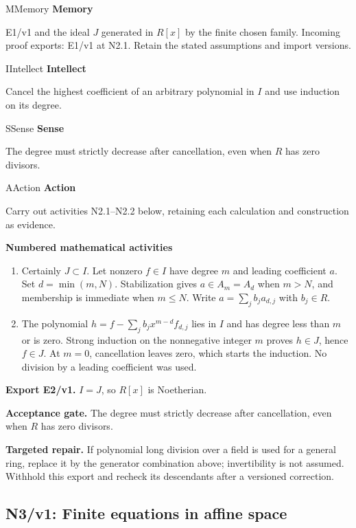 \documentclass[preprint,12pt,aps,pra,showkeys,amsmath,amssymb,superscriptaddress,floatfix]{revtex4-2}
\theoremstyle{definition}
\theoremstyle{remark}
\newcommand{\mmfaculty}[3]{%
 \begin{mmfacultybox}{#1}{#2}
 {\sffamily\bfseries\color{MMBlue}#2}\par\smallskip #3
 \end{mmfacultybox}}
\newcommand{\field}[2]{\par\smallskip\noindent\textbf{#1.} #2\par}
\begin{document}
\mmfaculty{M}{Memory}{E1/v1 and the ideal \(J\) generated in \(R[x]\) by the finite chosen
family. Incoming proof exports: E1/v1 at N2.1. Retain the stated
assumptions and import versions.}

\mmfaculty{I}{Intellect}{Cancel the highest coefficient of an arbitrary polynomial in \(I\) and
use induction on its degree.}

\mmfaculty{S}{Sense}{The degree must strictly decrease after cancellation, even when \(R\)
has zero divisors.}

\mmfaculty{A}{Action}{Carry out activities N2.1--N2.2 below, retaining each calculation and
construction as evidence.}

\smallskip\noindent\textbf{Numbered mathematical activities}

\begin{enumerate}[label=N2.\arabic*,leftmargin=3.4em]

\item Certainly \(J\subset I\). Let nonzero \(f\in I\) have degree \(m\) and
leading coefficient \(a\). Set \(d=\min(m,N)\). Stabilization gives
\(a\in A_m=A_d\) when \(m>N\), and membership is immediate when
\(m\le N\). Write \(a=\sum_j b_j a_{d,j}\) with \(b_j\in R\).

\item The polynomial \(h=f-\sum_j b_j x^{m-d}f_{d,j}\) lies in \(I\) and has
degree less than \(m\) or is zero. Strong induction on the nonnegative
integer \(m\) proves \(h\in J\), hence \(f\in J\). At \(m=0\),
cancellation leaves zero, which starts the induction. No division by a
leading coefficient was used.

\end{enumerate}

\field{Export E2/v1}{\(I=J\), so \(R[x]\) is Noetherian.}

\field{Acceptance gate}{The degree must strictly decrease after cancellation, even when \(R\)
has zero divisors.}

\field{Targeted repair}{If polynomial long division over a field is used for a general ring,
replace it by the generator combination above; invertibility is not
assumed. Withhold this export and recheck its descendants after a
versioned correction.}

\clearpage

\subsection{N3/v1: Finite equations in affine space}
\end{document}
